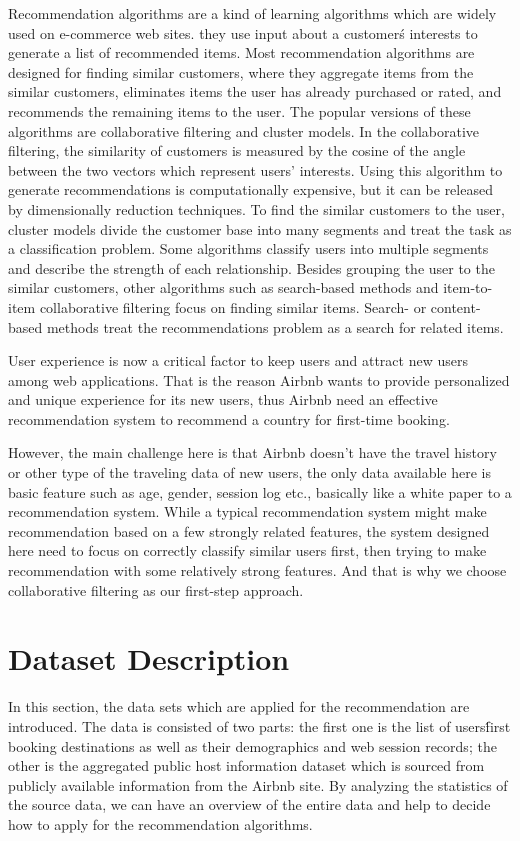 \documentclass{sig-alternate-05-2015}
\begin{document}
Recommendation algorithms are a kind of learning algorithms which are widely used on e-commerce web sites.  they use input about a customer\'s interests to generate a list of recommended items. Most recommendation algorithms are designed for finding similar customers, where they aggregate items from the similar customers, eliminates items the user has already purchased or rated, and recommends the remaining items to the user. The popular versions of these algorithms are collaborative filtering and cluster models. In the collaborative filtering, the similarity of customers is measured by the cosine of the angle between the two vectors which represent users' interests\cite{analysis}. Using this algorithm to generate recommendations is computationally expensive, but it can be released by dimensionally reduction techniques\cite{collaborative}. To find the similar customers to the user, cluster models divide the customer base into many segments and treat the task as a classification problem\cite{clustering}.  Some algorithms classify users into multiple segments and describe the strength of each relationship\cite{cf}. Besides grouping the user to the similar customers, other algorithms such as search-based methods and item-to-item collaborative filtering focus on finding similar items\cite{item2item}. Search- or content-based methods treat the recommendations problem as a search for related items\cite{massive}.

User experience is now a critical factor to keep users and attract new users among web applications. That is the reason Airbnb wants to provide personalized and unique experience for its new users, thus Airbnb need an effective recommendation system to recommend a country for first-time booking.

However, the main challenge here is that Airbnb doesn't have the travel history or other type of the traveling data of new users, the only data available here is basic feature such as age, gender, session log etc., basically like a white paper to a recommendation system. While a typical recommendation system might make recommendation based on a few strongly related features, the system designed here need to focus on correctly classify similar users first, then trying to make recommendation with some relatively strong features. And that is why we choose collaborative filtering as our first-step approach.

\section{Dataset Description}
In this section, the data sets which are applied for the recommendation are introduced. The data is  consisted of two parts: the first one is the list of users\' first booking destinations as well as their demographics and web session records; the other is the aggregated public host information dataset which is sourced from publicly available information from the Airbnb site. By analyzing the statistics of the source data, we can have an overview of the entire data and help to decide how to apply for the recommendation algorithms.
\end{document}
